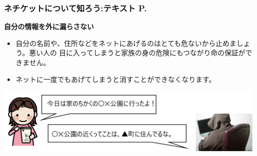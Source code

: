 \documentclass[dvipdfmx]{beamer}
\begin{document}
\begin{frame}[fragile]
	\frametitle{ネチケットについて知ろう:テキスト P.\pageref{1:P:Netiquette}~~~}
    \large\textbf{自分の情報を外に漏らさない}
            \begin{itemize}
                \item 自分の名前や、住所などをネットにあげるのはとても危ないから止めましょう。悪い人の
                目に入ってしまうと家族の身の危険にもつながり命の保証ができません。
                \item ネットに一度でもあげてしまうと消すことができなくなります。
            \end{itemize}
            \vfill
            
			\begin{minipage}{\textwidth}
                {\upshape
                  \includegraphics[width=\textwidth]{slide07-img007.png}}
            \end{minipage}
\end{frame}
\end{document}
